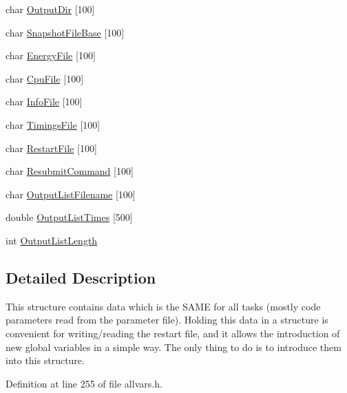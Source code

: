 \begin{DoxyCompactItemize}
\item 
char \hyperlink{structglobal__data__all__processes_aebda5d1b80cfb767b9668d7858c36bcc}{OutputDir} \mbox{[}100\mbox{]}
\item 
char \hyperlink{structglobal__data__all__processes_a4bcf5b5c31545691038015af9ae9acb3}{SnapshotFileBase} \mbox{[}100\mbox{]}
\item 
char \hyperlink{structglobal__data__all__processes_aa97394ab3a522c46b75f8b57a59ca0b5}{EnergyFile} \mbox{[}100\mbox{]}
\item 
char \hyperlink{structglobal__data__all__processes_ac2ba980c60460b89534ca8bba63cd679}{CpuFile} \mbox{[}100\mbox{]}
\item 
char \hyperlink{structglobal__data__all__processes_a3cbcdacb8b522288268993f0ce5b15ac}{InfoFile} \mbox{[}100\mbox{]}
\item 
char \hyperlink{structglobal__data__all__processes_ae0f7c691d211f8076374cc55271022e8}{TimingsFile} \mbox{[}100\mbox{]}
\item 
char \hyperlink{structglobal__data__all__processes_a67e197a37469217aa8ad32c42230b286}{RestartFile} \mbox{[}100\mbox{]}
\item 
char \hyperlink{structglobal__data__all__processes_a59f86964a3a1b03933a787cfc280951a}{ResubmitCommand} \mbox{[}100\mbox{]}
\item 
char \hyperlink{structglobal__data__all__processes_a063be13ecadec873ebaad1b3645a5323}{OutputListFilename} \mbox{[}100\mbox{]}
\item 
double \hyperlink{structglobal__data__all__processes_a7f3307450336a806e545661ba6c79ba5}{OutputListTimes} \mbox{[}500\mbox{]}
\item 
int \hyperlink{structglobal__data__all__processes_af0ada535a17b75233e0e0de6ff8fa448}{OutputListLength}
\end{DoxyCompactItemize}


\subsection{Detailed Description}
This structure contains data which is the SAME for all tasks (mostly code parameters read from the parameter file). Holding this data in a structure is convenient for writing/reading the restart file, and it allows the introduction of new global variables in a simple way. The only thing to do is to introduce them into this structure. 

Definition at line 255 of file allvars.h.



